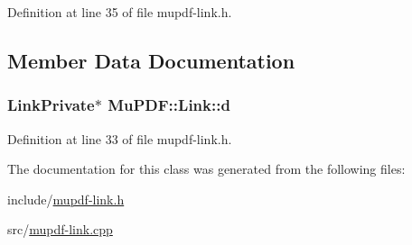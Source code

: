 Definition at line 35 of file mupdf-\/link.\-h.



\subsection{Member Data Documentation}
\hypertarget{class_mu_p_d_f_1_1_link_a5723c1b46286b89fd7a8fccfa3dc05d2}{
\subsubsection[{d}]{\setlength{\rightskip}{0pt plus 5cm}Link\-Private$\ast$ Mu\-P\-D\-F\-::\-Link\-::d\hspace{0.3cm}{\ttfamily [protected]}}}\label{class_mu_p_d_f_1_1_link_a5723c1b46286b89fd7a8fccfa3dc05d2}


Definition at line 33 of file mupdf-\/link.\-h.



The documentation for this class was generated from the following files\-:\begin{DoxyCompactItemize}
\item 
include/\hyperlink{mupdf-link_8h}{mupdf-\/link.\-h}\item 
src/\hyperlink{mupdf-link_8cpp}{mupdf-\/link.\-cpp}\end{DoxyCompactItemize}
